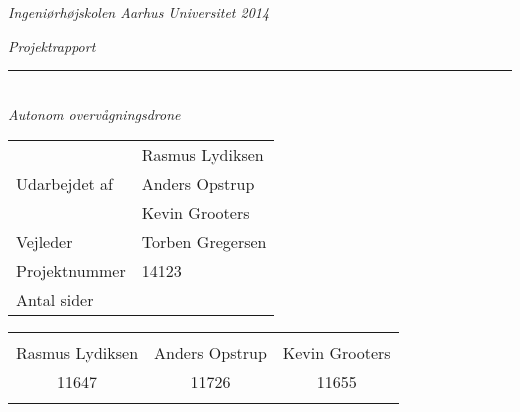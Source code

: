 \thispagestyle{empty}

\begin{center}
\textsl{Ingeniørhøjskolen Aarhus Universitet 2014 } \\ \vspace{0.5cm}

\phantom{hul}
\phantom{hul}
\phantom{hul}
\phantom{hul}
\phantom{hul}
\phantom{hul}
\phantom{hul}

\textsl{\HUGE Projektrapport } \\ \vspace{0cm}
\rule{15cm}{0.5mm}  \\ \vspace{0.5cm}
\textsl{\LARGE Autonom overvågningsdrone } \\ \vspace{0.5cm}

\vspace{2.5cm}

\begin{table}[h]
\begin{tabular}{l|l}
\hline

 						&	Rasmus Lydiksen 				\\
Udarbejdet af \hspace{5cm} &	Anders Opstrup  \hspace{3.8cm}	\\
 						&  	Kevin Grooters					\\ \hline

Vejleder				&	Torben Gregersen 				\\ \hline
Projektnummer			&	14123 			 				\\ \hline
Antal sider				&	\pageref{LastPage} 				\\ \hline
\end{tabular}
\end{table}

\vspace{8cm}

\begin{table}[H]
	\centering
		\begin{tabular}{c c c}
			\underline{\phantom{mmmmmmmmmmmmmm}} & \underline{\phantom{mmmmmmmmmmmmmm}} & \underline{\phantom{mmmmmmmmmmmmmm}} \\
			Rasmus Lydiksen			& Anders Opstrup 		& Kevin Grooters 			\\
			11647					& 11726					& 11655\\
			&&\\												
		\end{tabular}
\end{table}
\end{center}